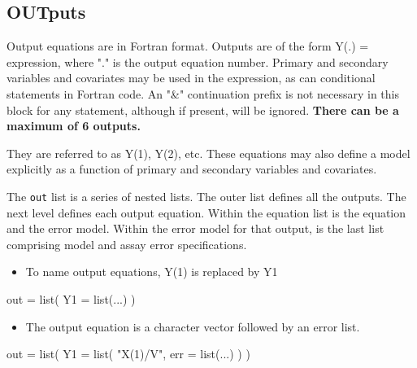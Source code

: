 \documentclass[
]{book}
\newenvironment{Shaded}{\begin{snugshade}}{\end{snugshade}}
\newcommand{\AttributeTok}[1]{\textcolor[rgb]{0.77,0.63,0.00}{#1}}
\newcommand{\FunctionTok}[1]{\textcolor[rgb]{0.00,0.00,0.00}{#1}}
\newcommand{\NormalTok}[1]{#1}
\newcommand{\OtherTok}[1]{\textcolor[rgb]{0.56,0.35,0.01}{#1}}
\newcommand{\StringTok}[1]{\textcolor[rgb]{0.31,0.60,0.02}{#1}}
\providecommand{\tightlist}{%
  \setlength{\itemsep}{0pt}\setlength{\parskip}{0pt}}
\begin{document}
\hypertarget{outR6}{%
\subsection{OUTputs}\label{outR6}}

Output equations are in Fortran format. Outputs are of the form Y(.) =
expression, where "." is the output equation number. Primary and
secondary variables and covariates may be used in the expression, as can conditional statements in Fortran code. An "\&" continuation prefix is not necessary in this block for any statement, although if present, will be ignored. \textbf{There can be a maximum of 6 outputs.}

They are referred
to as Y(1), Y(2), etc. These equations may also define a model
explicitly as a function of primary and secondary variables and
covariates.

The \texttt{out} list is a series of nested lists. The outer list defines all the outputs. The next level defines each output equation. Within the equation list is the equation and the error model. Within the error model for that output, is the last list comprising model and assay error specifications.

\begin{itemize}
\tightlist
\item
  To name output equations, Y(1) is replaced by Y1
\end{itemize}

\begin{Shaded}
\begin{Highlighting}[]
\NormalTok{out }\OtherTok{=} \FunctionTok{list}\NormalTok{(}
  \AttributeTok{Y1 =} \FunctionTok{list}\NormalTok{(...)}
\NormalTok{)}
\end{Highlighting}
\end{Shaded}

\begin{itemize}
\tightlist
\item
  The output equation is a character vector followed by an error list.
\end{itemize}

\begin{Shaded}
\begin{Highlighting}[]
\NormalTok{out }\OtherTok{=} \FunctionTok{list}\NormalTok{(}
  \AttributeTok{Y1 =} \FunctionTok{list}\NormalTok{(}
    \StringTok{"X(1)/V"}\NormalTok{,}
    \AttributeTok{err =} \FunctionTok{list}\NormalTok{(...)}
\NormalTok{  )}
\NormalTok{)}
\end{Highlighting}
\end{Shaded}
\end{document}

